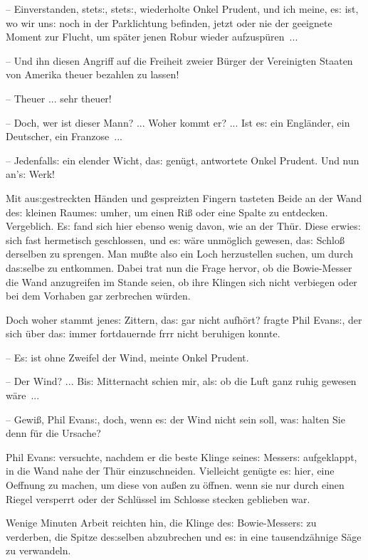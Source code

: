 \documentclass[oneside,12pt]{book}
\newcommand{\s}{s:}
\begin{document}
-- Einverstanden, stet{\s}, stet{\s}, wiederholte Onkel Prudent, und
ich meine, e{\s} ist, wo wir un{\s} noch in der Parklichtung
befinden, jetzt oder nie der geeignete Moment zur Flucht, um sp\"ater
jenen Robur wieder aufzusp\"uren~...

-- Und ihn diesen Angriff auf die Freiheit zweier B\"urger der
Vereinigten Staaten von Amerika theuer bezahlen zu lassen!

-- Theuer ... sehr theuer!

-- Doch, wer ist dieser Mann? ... Woher kommt er? ... Ist e{\s} ein
Engl\"ander, ein Deutscher, ein Franzose~...

-- Jedenfall{\s} ein elender Wicht, da{\s} gen\"ugt, antwortete Onkel
Prudent. Und nun an'{\s} Werk!{\grqq}

Mit au{\s}gestreckten H\"anden und gespreizten Fingern tasteten Beide
an der Wand de{\s} kleinen Raume{\s} umher, um einen Ri{\ss} oder
eine Spalte zu entdecken. Vergeblich. E{\s} fand sich hier ebenso
wenig davon, wie an der Th\"ur. Diese erwie{\s} sich fast hermetisch
geschlossen, und e{\s} w\"are unm\"oglich gewesen, da{\s} Schlo{\ss}
derselben zu sprengen. Man mu{\ss}te also ein Loch herzustellen
suchen, um durch da{\s}selbe zu entkommen. Dabei trat nun die Frage
hervor, ob die Bowie-Messer die Wand anzugreifen im Stande seien, ob
ihre Klingen sich nicht verbiegen oder bei dem Vorhaben gar
zerbrechen w\"urden.

{\glqq}Doch woher stammt jene{\s} Zittern, da{\s} gar nicht
aufh\"ort? fragte Phil Evan{\s}, der sich \"uber da{\s} immer
fortdauernde frrr nicht beruhigen konnte.

-- E{\s} ist ohne Zweifel der Wind, meinte Onkel Prudent.

-- Der Wind? ... Bi{\s} Mitternacht schien mir, al{\s} ob die Luft
ganz ruhig gewesen w\"are~...

-- Gewi{\ss}, Phil Evan{\s}, doch, wenn e{\s} der Wind nicht sein
soll, wa{\s} halten Sie denn f\"ur die Ursache?{\grqq}

Phil Evan{\s} versuchte, nachdem er die beste Klinge seine{\s}
Messer{\s} aufgeklappt, in die Wand nahe der Th\"ur einzuschneiden.
Vielleicht gen\"ugte e{\s} hier, eine Oeffnung zu machen, um diese
von au{\ss}en zu \"offnen. wenn sie nur durch einen Riegel versperrt
oder der Schl\"ussel im Schlosse stecken geblieben war.

Wenige Minuten Arbeit reichten hin, die Klinge de{\s}
Bowie-Messer{\s} zu verderben, die Spitze de{\s}selben abzubrechen
und e{\s} in eine tausendz\"ahnige S\"age zu verwandeln.
\end{document}
